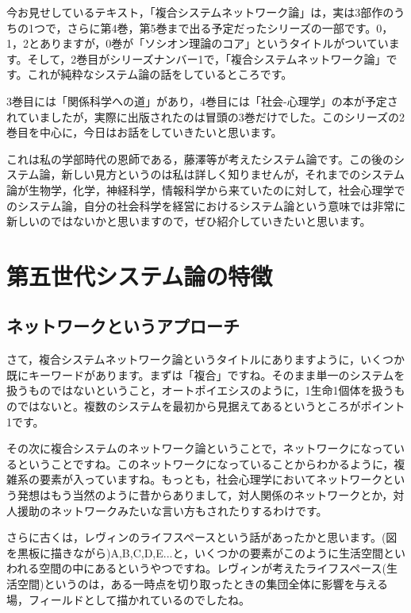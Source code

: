 \documentclass{ltjsbook}
\begin{document}
今お見せしているテキスト，「複合システムネットワーク論」\parencite{fujisawaNetwork}は，実は3部作のうちの1つで，さらに第4巻，第5巻まで出る予定だったシリーズの一部です。0，1，2とありますが，0巻が「ソシオン理論のコア」\parencite{fujisawaCore}というタイトルがついています。そして，2巻目がシリーズナンバー1で，「複合システムネットワーク論」\parencite{fujisawaNetwork}です。これが純粋なシステム論の話をしているところです。

3巻目には「関係科学への道」があり\parencite{fujisawaRelationships}，4巻目には「社会-心理学」の本が予定されていましたが，実際に出版されたのは冒頭の3巻だけでした。このシリーズの2巻目を中心に，今日はお話をしていきたいと思います。

これは私の学部時代の恩師である，藤澤等が考えたシステム論です。この後のシステム論，新しい見方というのは私は詳しく知りませんが，それまでのシステム論が生物学，化学，神経科学，情報科学から来ていたのに対して，社会心理学でのシステム論，自分の社会科学を経営におけるシステム論という意味では非常に新しいのではないかと思いますので，ぜひ紹介していきたいと思います。


\section{第五世代システム論の特徴}
\subsection{ネットワークというアプローチ}

さて，複合システムネットワーク論というタイトルにありますように，いくつか既にキーワードがあります。まずは「複合」ですね。そのまま単一のシステムを扱うものではないということ，オートポイエシスのように，1生命1個体を扱うものではないと。複数のシステムを最初から見据えてあるというところがポイント1です。

その次に複合システムのネットワーク論ということで，ネットワークになっているということですね。このネットワークになっていることからわかるように，複雑系の要素が入っていますね。もっとも，社会心理学においてネットワークという発想はもう当然のように昔からありまして，対人関係のネットワークとか，対人援助のネットワークみたいな言い方もされたりするわけです。

さらに古くは，レヴィンのライフスペースという話があったかと思います。(図を黒板に描きながら)A,B,C,D,E...と，いくつかの要素がこのように生活空間といわれる空間の中にあるというやつですね。レヴィンが考えたライフスペース(生活空間)というのは，ある一時点を切り取ったときの集団全体に影響を与える場，フィールドとして描かれているのでしたね。
\end{document}

